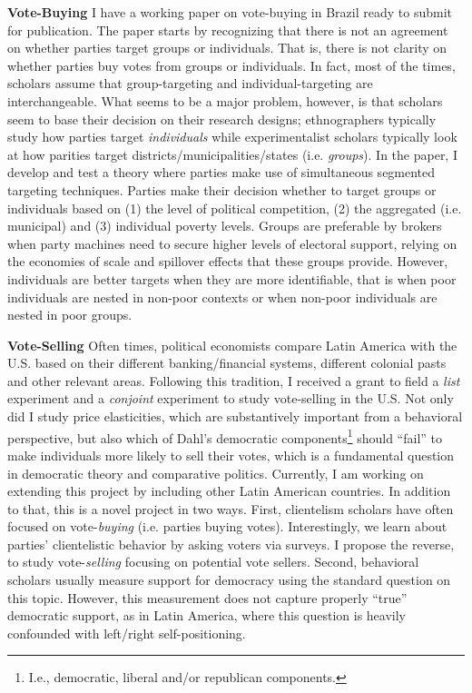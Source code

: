 \documentclass[11pt]{letter} %
\begin{document}
\begin{letter}{}
{\bf Vote-Buying} I have a working paper on vote-buying in Brazil ready to submit for publication. The paper starts by recognizing that there is not an agreement on whether parties target groups or individuals. That is, there is not clarity on whether parties buy votes from groups or individuals. In fact, most of the times, scholars assume that group-targeting and individual-targeting are interchangeable. What seems to be a major problem, however, is that scholars seem to base their decision on their research designs; ethnographers typically study how parties target \emph{individuals} while experimentalist scholars typically look at how parities target districts/municipalities/states (i.e. \emph{groups}). In the paper, I develop and test a theory where parties make use of simultaneous segmented targeting techniques. Parties make their decision whether to target groups or individuals based on (1) the level of political competition, (2) the aggregated (i.e. municipal) and  (3) individual poverty levels. Groups are preferable by brokers when party machines need to secure higher levels of electoral support, relying on the economies of scale and spillover effects that these groups provide. However, individuals are better targets when they are more identifiable, that is when poor individuals are nested in non-poor contexts or when non-poor individuals are nested in poor groups.

{\bf Vote-Selling} Often times, political economists compare Latin America with the U.S. based on their different banking/financial systems, different colonial pasts and other relevant areas. Following this tradition, I received a grant to field a \emph{list} experiment and a \emph{conjoint} experiment to study vote-selling in the U.S. Not only did I study price elasticities, which are substantively important from a behavioral perspective, but also which of Dahl's democratic components\footnote{I.e., democratic, liberal and/or republican components.} should ``fail'' to make individuals more likely to sell their votes, which is a fundamental question in democratic theory and comparative politics. Currently, I am working on extending this project by including other Latin American countries. In addition to that, this is a novel project in two ways. First, clientelism scholars have often focused on vote-\emph{buying} (i.e. parties buying votes). Interestingly, we learn about parties' clientelistic behavior by asking voters via surveys. I propose the reverse, to study vote-\emph{selling} focusing on potential vote sellers. Second, behavioral scholars usually measure support for democracy using the standard question on this topic. However, this measurement does not capture properly ``true'' democratic support, as in Latin America, where this question is heavily confounded with left/right self-positioning. 


\end{letter}
\end{document}
